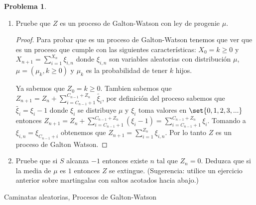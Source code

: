 \documentclass[a5paper,oneside]{amsart}
\theoremstyle{plain}
\theoremstyle{definition}
\newtheorem{problema}{Problema}
\begin{document}
\begin{problema}
\begin{enumerate}
\item Pruebe que $Z$ es un proceso de Galton-Watson con ley de progenie $\mu$.
\begin{proof}
Para probar que es un proceso de Galton-Watson tenemos que ver que es un proceso que cumple con las siguientes caracter\'isticas: $X_0=k\geq 0$ y $X_{n+1}=\sum_{i=1}^{X_n}\xi_{i,n}$ donde $\xi_{i,n}$ son variables aleatorias con distribuci\'on $\mu$, $\mu=(\mu_k, k\geq 0)$ y $\mu_k$ es la probabilidad de tener $k$ hijos. 

Ya sabemos que $Z_0=k\geq 0$. Tambien sabemos que $Z_{n+1}=Z_n+\sum_{i=C_{n-1}+1}^{C_{n-1}+Z_n}\tilde{\xi_i}$, por definici\'on del proceso sabemos que $\tilde{\xi_i}=\xi_i-1$ donde $\xi_i$ se distribuye $\mu$ y $\xi_i$ toma valores en $\set{0,1,2,3,...}$ entonces $Z_{n+1}=Z_n+\sum_{i=C_{n-1}+1}^{C_{n-1}+Z_n}(\xi_i-1)=\sum_{i=C_{n-1}+1}^{C_{n-1}+Z_n}\xi_i$. Tomando a $\xi_{i,n}=\xi_{C_{n-1}+i}$ obtenemos que $Z_{n+1}=\sum_{i=1}^{Z_n}\xi_{i,n}$. Por lo tanto $Z$ es un proceso de Galton Watson.
\end{proof}
\item Pruebe que si $S$ alcanza $-1$ entonces existe $n$ tal que $Z_n=0$. Deduzca que si la media de $\mu$ es $1$ entonces $Z$ se extingue. (Sugerencia: utilice un ejercicio anterior sobre martingalas con saltos acotados hacia abajo.) 
\end{enumerate}

 Caminatas aleatorias, Procesos de Galton-Watson%
\end{problema}
\end{document}
